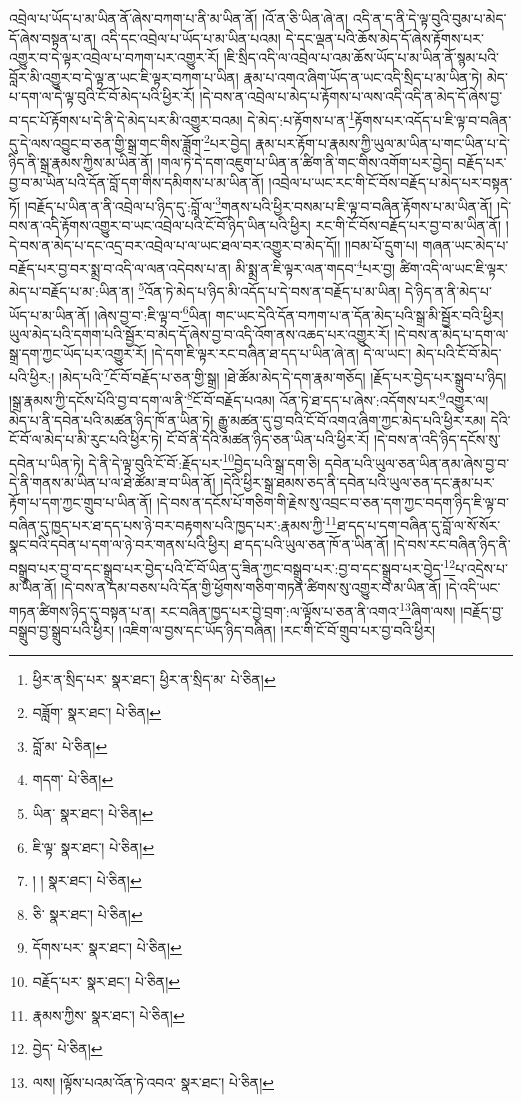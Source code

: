 འབྲེལ་པ་ཡོད་པ་མ་ཡིན་ནོ་ཞེས་བཀག་པ་ནི་མ་ཡིན་ནོ། །འོ་ན་ཅི་ཡིན་ཞེ་ན། འདི་ན་ད་ནི་དེ་ལྟ་བུའི་བུམ་པ་མེད་དོ་ཞེས་བསྟན་པ་ན། འདི་དང་འབྲེལ་པ་ཡོད་པ་མ་ཡིན་པའམ། དེ་དང་ལྡན་པའི་ཆོས་མེད་དོ་ཞེས་རྟོགས་པར་འགྱུར་བ་དེ་ལྟར་འབྲེལ་པ་བཀག་པར་འགྱུར་རོ། །ཇི་སྲིད་འདི་ལ་འབྲེལ་པ་འམ་ཆོས་ཡོད་པ་མ་ཡིན་ནོ་སྙམ་པའི་བློར་མི་འགྱུར་བ་དེ་ལྟ་ན་ཡང་ཇི་ལྟར་བཀག་པ་ཡིན། རྣམ་པ་འགའ་ཞིག་ཡོད་ན་ཡང་འདི་སྲིད་པ་མ་ཡིན་ཏེ། མེད་པ་དག་ལ་དེ་ལྟ་བུའི་ངོ་བོ་མེད་པའི་ཕྱིར་རོ། །དེ་བས་ན་འབྲེལ་པ་མེད་པ་རྟོགས་པ་ལས་འདི་འདི་ན་མེད་དོ་ཞེས་བྱ་བ་དང་པོ་རྟོགས་པ་དེ་ནི་དེ་མེད་པར་མི་འགྱུར་བའམ། དེ་མེད་:པ་རྟོགས་པ་ན་\footnote{ཕྱིར་ན་སྲིད་པར་  སྣར་ཐང་། ཕྱིར་ན་སྲིད་མ་  པེ་ཅིན། }རྟོགས་པར་འདོད་པ་ཇི་ལྟ་བ་བཞིན་དུ་དེ་ལས་འབྱུང་བ་ཅན་གྱི་སྒྲ་གང་གིས་ཟློག་\footnote{བཟློག་  སྣར་ཐང་།  པེ་ཅིན། }པར་བྱེད། རྣམ་པར་རྟོག་པ་རྣམས་ཀྱི་ཡུལ་མ་ཡིན་པ་གང་ཡིན་པ་དེ་ཉིད་ནི་སྒྲ་རྣམས་ཀྱིས་མ་ཡིན་ནོ། །གལ་ཏེ་དེ་དག་འཇུག་པ་ཡིན་ན་ཚིག་ནི་གང་གིས་འགོག་པར་བྱེད། བརྗོད་པར་བྱ་བ་མ་ཡིན་པའི་དོན་བློ་དག་གིས་དམིགས་པ་མ་ཡིན་ནོ། །འབྲེལ་པ་ཡང་རང་གི་ངོ་བོས་བརྗོད་པ་མེད་པར་བསྟན་ཏོ། །བརྗོད་པ་ཡིན་ན་ནི་འབྲེལ་པ་ཉིད་དུ་:བློ་ལ་\footnote{བློ་མ་  པེ་ཅིན། }གནས་པའི་ཕྱིར་བསམ་པ་ཇི་ལྟ་བ་བཞིན་རྟོགས་པ་མ་ཡིན་ནོ། །དེ་བས་ན་འདི་རྟོགས་འགྱུར་བ་ཡང་འབྲེལ་པའི་ངོ་བོ་ཉིད་ཡིན་པའི་ཕྱིར། རང་གི་ངོ་བོས་བརྗོད་པར་བྱ་བ་མ་ཡིན་ནོ། །དེ་བས་ན་མེད་པ་དང་འདྲ་བར་འབྲེལ་པ་ལ་ཡང་ཐལ་བར་འགྱུར་བ་མེད་དོ།། །།བམ་པོ་དྲུག་པ། གཞན་ཡང་མེད་པ་བརྗོད་པར་བྱ་བར་སྨྲ་བ་འདི་ལ་ལན་འདེབས་པ་ན། མི་སྨྲ་ན་ཇི་ལྟར་ལན་གདབ་\footnote{གདག་  པེ་ཅིན། }པར་བྱ། ཚིག་འདི་ལ་ཡང་ཇི་ལྟར་མེད་པ་བརྗོད་པ་མ་:ཡིན་ན། \footnote{ཡིན་  སྣར་ཐང་།  པེ་ཅིན། }འོན་ཏེ་མེད་པ་ཉིད་མི་འདོད་པ་དེ་བས་ན་བརྗོད་པ་མ་ཡིན། དེ་ཉིད་ན་ནི་མེད་པ་ཡོད་པ་མ་ཡིན་ནོ། །ཞེས་བྱ་བ་:ཇི་ལྟ་བ་\footnote{ཇི་ལྟ་  སྣར་ཐང་།  པེ་ཅིན། }ཡིན། གང་ཡང་དེའི་དོན་བཀག་པ་ན་དོན་མེད་པའི་སྒྲ་མི་སྦྱོར་བའི་ཕྱིར། ཡུལ་མེད་པའི་དགག་པའི་སྦྱོར་བ་མེད་དོ་ཞེས་བྱ་བ་འདི་འོག་ནས་འཆད་པར་འགྱུར་རོ། །དེ་བས་ན་མེད་པ་དག་ལ་སྒྲ་དག་ཀྱང་ཡོད་པར་འགྱུར་རོ། །དེ་དག་ཇི་ལྟར་རང་བཞིན་ཐ་དད་པ་ཡིན་ཞེ་ན། དེ་ལ་ཡང་། མེད་པའི་ངོ་བོ་མེད་པའི་ཕྱིར:། །མེད་པའི་\footnote{། །  སྣར་ཐང་།  པེ་ཅིན། }ངོ་བོ་བརྗོད་པ་ཅན་གྱི་སྒྲ། །ཐེ་ཚོམ་མེད་དེ་དག་རྣམ་གཅོད། །རྗོད་པར་བྱེད་པར་སྒྲུབ་པ་ཉིད། །སྒྲ་རྣམས་ཀྱི་དངོས་པོའི་བྱ་བ་དག་ལ་ནི་\footnote{ཅི་  སྣར་ཐང་།  པེ་ཅིན། }ངོ་བོ་བརྗོད་པའམ། འོན་ཏེ་ཐ་དད་པ་ཞེས་:འདོགས་པར་\footnote{དོགས་པར་  སྣར་ཐང་།  པེ་ཅིན། }འགྱུར་ལ། མེད་པ་ནི་དབེན་པའི་མཚན་ཉིད་ཁོ་ན་ཡིན་ཏེ། རྒྱུ་མཚན་དུ་བྱ་བའི་ངོ་བོ་འགའ་ཞིག་ཀྱང་མེད་པའི་ཕྱིར་རམ། དེའི་ངོ་བོ་ལ་མེད་པ་མི་རུང་པའི་ཕྱིར་ཏེ། ངོ་བོ་ནི་དེའི་མཚན་ཉིད་ཅན་ཡིན་པའི་ཕྱིར་རོ། །དེ་བས་ན་འདི་ཉིད་དངོས་སུ་དབེན་པ་ཡིན་ཏེ། དེ་ནི་དེ་ལྟ་བུའི་ངོ་བོ་:རྗོད་པར་\footnote{བརྗོད་པར་  སྣར་ཐང་།  པེ་ཅིན། }བྱེད་པའི་སྒྲ་དག་ཅི། དབེན་པའི་ཡུལ་ཅན་ཡིན་ནམ་ཞེས་བྱ་བ་དེ་ནི་གནས་མ་ཡིན་པ་ལ་ཐེ་ཚོམ་ཟ་བ་ཡིན་ནོ། །དེའི་ཕྱིར་སྒྲ་ཐམས་ཅད་ནི་དབེན་པའི་ཡུལ་ཅན་དང་རྣམ་པར་རྟོག་པ་དག་ཀྱང་གྲུབ་པ་ཡིན་ནོ། །དེ་བས་ན་དངོས་པོ་གཅིག་གི་རྗེས་སུ་འབྲང་བ་ཅན་དག་ཀྱང་བདག་ཉིད་ཇི་ལྟ་བ་བཞིན་དུ་ཁྱད་པར་ཐ་དད་པས་ཉེ་བར་བརྟགས་པའི་ཁྱད་པར་:རྣམས་ཀྱི་\footnote{རྣམས་ཀྱིས་  སྣར་ཐང་།  པེ་ཅིན། }ཐ་དད་པ་དག་བཞིན་དུ་བློ་ལ་སོ་སོར་སྣང་བའི་དབེན་པ་དག་ལ་ཉེ་བར་གནས་པའི་ཕྱིར། ཐ་དད་པའི་ཡུལ་ཅན་ཁོ་ན་ཡིན་ནོ། །དེ་བས་རང་བཞིན་ཉིད་ནི་བསྒྲུབ་པར་བྱ་བ་དང་སྒྲུབ་པར་བྱེད་པའི་ངོ་བོ་ཡིན་དུ་ཟིན་ཀྱང་བསྒྲུབ་པར་:བྱ་བ་དང་སྒྲུབ་པར་བྱེད་\footnote{བྱེད་  པེ་ཅིན། }པ་འདྲེས་པ་མ་ཡིན་ནོ། །དེ་བས་ན་དམ་བཅས་པའི་དོན་གྱི་ཕྱོགས་གཅིག་གཏན་ཚིགས་སུ་འགྱུར་བ་མ་ཡིན་ནོ། །དེ་འདི་ཡང་གཏན་ཚིགས་ཉིད་དུ་བསྟན་པ་ན། རང་བཞིན་ཁྱད་པར་བྱེ་བྲག་:ལ་ལྟོས་པ་ཅན་ནི་འགའ་\footnote{ལས། །ལྟོས་པའམ་འོན་ཏེ་འབའ་  སྣར་ཐང་།  པེ་ཅིན། }ཞིག་ལས། །བརྗོད་བྱ་བསྒྲུབ་བྱ་སྒྲུབ་པའི་ཕྱིར། །འཇིག་ལ་བྱས་དང་ཡོད་ཉིད་བཞིན། །རང་གི་ངོ་བོ་གྲུབ་པར་བྱ་བའི་ཕྱིར། 